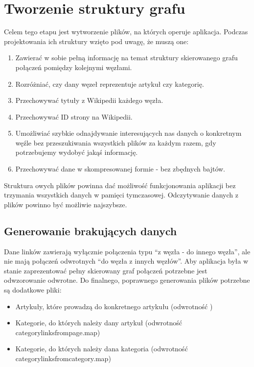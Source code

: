 \section{Tworzenie struktury grafu}
\label{sec:data-files}
Celem tego etapu jest wytworzenie plików, na których operuje aplikacja. Podczas projektowania ich struktury wzięto pod uwagę, że muszą one:
\begin{enumerate}
    \setlength\itemsep{0.2em}
    \item Zawierać w sobie pełną informację na temat struktury skierowanego grafu połączeń pomiędzy kolejnymi węzłami.
    \item Rozróżniać, czy dany węzeł reprezentuje artykuł czy kategorię.
    \item Przechowywać tytuły z Wikipedii każdego węzła.
    \item Przechowywać ID strony na Wikipedii.
    \item Umożliwiać szybkie odnajdywanie interesujących nas danych o konkretnym węźle bez przeszukiwania wszystkich plików za każdym razem, gdy potrzebujemy wydobyć jakąś informację.
    \item Przechowywać dane w skompresowanej formie - bez zbędnych bajtów.
\end{enumerate}

Struktura owych plików powinna dać możliwość funkcjonowania aplikacji bez trzymania wszystkich danych w pamięci tymczasowej. Odczytywanie danych z plików powinno być możliwie najszybsze.

\subsection{Generowanie brakujących danych}
\label{sec:generating-missing-files}

Dane linków zawierają wyłącznie połączenia typu ``z węzła - do innego węzła'', ale nie mają połączeń odwrotnych ``do węzła z innych węzłów''. Aby aplikacja była w stanie zaprezentować pełny skierowany graf połączeń potrzebne jest odwzorowanie odwrotne.
Do finalnego, poprawnego generowania plików potrzebne są dodatkowe pliki:
\begin{itemize}
    \setlength\itemsep{0.2em}
    \item Artykuły, które prowadzą do konkretnego artykułu (odwrotność )
    \item Kategorie, do których należy dany artykuł (odwrotność categorylinksfrompage.map)
    \item Kategorie, do których należy dana kategoria (odwrotność categorylinksfromcategory.map)
\end{itemize}

